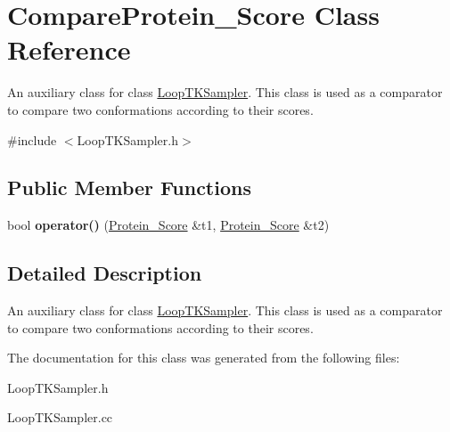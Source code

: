 \hypertarget{classCompareProtein__Score}{\section{Compare\-Protein\-\_\-\-Score Class Reference}
\label{classCompareProtein__Score}
}


An auxiliary class for class \hyperlink{classLoopTKSampler}{Loop\-T\-K\-Sampler}. This class is used as a comparator to compare two conformations according to their scores.  




{\ttfamily \#include $<$Loop\-T\-K\-Sampler.\-h$>$}

\subsection*{Public Member Functions}
\begin{DoxyCompactItemize}
\item 
\hypertarget{classCompareProtein__Score_a088992f3f5c773cc7278bea98706fa22}{bool {\bfseries operator()} (\hyperlink{classProtein__Score}{Protein\-\_\-\-Score} \&t1, \hyperlink{classProtein__Score}{Protein\-\_\-\-Score} \&t2)}\label{classCompareProtein__Score_a088992f3f5c773cc7278bea98706fa22}

\end{DoxyCompactItemize}


\subsection{Detailed Description}
An auxiliary class for class \hyperlink{classLoopTKSampler}{Loop\-T\-K\-Sampler}. This class is used as a comparator to compare two conformations according to their scores. 

The documentation for this class was generated from the following files\-:\begin{DoxyCompactItemize}
\item 
Loop\-T\-K\-Sampler.\-h\item 
Loop\-T\-K\-Sampler.\-cc\end{DoxyCompactItemize}
